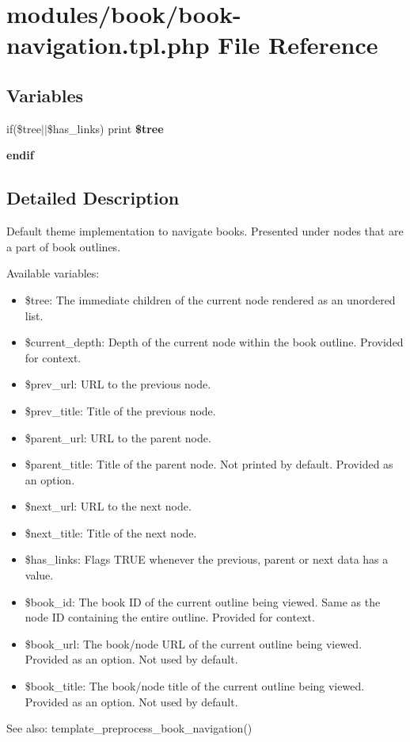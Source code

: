 \hypertarget{book-navigation_8tpl_8php}{
\section{modules/book/book-navigation.tpl.php File Reference}
\label{book-navigation_8tpl_8php}
}
\subsection*{Variables}
\begin{CompactItemize}
\item 
\hypertarget{book-navigation_8tpl_8php_250010eed3e0a7047a9141f8f7eb73b0}{
if(\$tree$|$$|$\$has\_\-links) print \textbf{\$tree}}
\label{book-navigation_8tpl_8php_250010eed3e0a7047a9141f8f7eb73b0}

\item 
\hypertarget{book-navigation_8tpl_8php_82cd33ca97ff99f2fcc5e9c81d65251b}{
\textbf{endif}}
\label{book-navigation_8tpl_8php_82cd33ca97ff99f2fcc5e9c81d65251b}

\end{CompactItemize}


\subsection{Detailed Description}
Default theme implementation to navigate books. Presented under nodes that are a part of book outlines.

Available variables:\begin{itemize}
\item \$tree: The immediate children of the current node rendered as an unordered list.\item \$current\_\-depth: Depth of the current node within the book outline. Provided for context.\item \$prev\_\-url: URL to the previous node.\item \$prev\_\-title: Title of the previous node.\item \$parent\_\-url: URL to the parent node.\item \$parent\_\-title: Title of the parent node. Not printed by default. Provided as an option.\item \$next\_\-url: URL to the next node.\item \$next\_\-title: Title of the next node.\item \$has\_\-links: Flags TRUE whenever the previous, parent or next data has a value.\item \$book\_\-id: The book ID of the current outline being viewed. Same as the node ID containing the entire outline. Provided for context.\item \$book\_\-url: The book/node URL of the current outline being viewed. Provided as an option. Not used by default.\item \$book\_\-title: The book/node title of the current outline being viewed. Provided as an option. Not used by default.\end{itemize}


\begin{Desc}
\item[See also:]template\_\-preprocess\_\-book\_\-navigation() \end{Desc}
